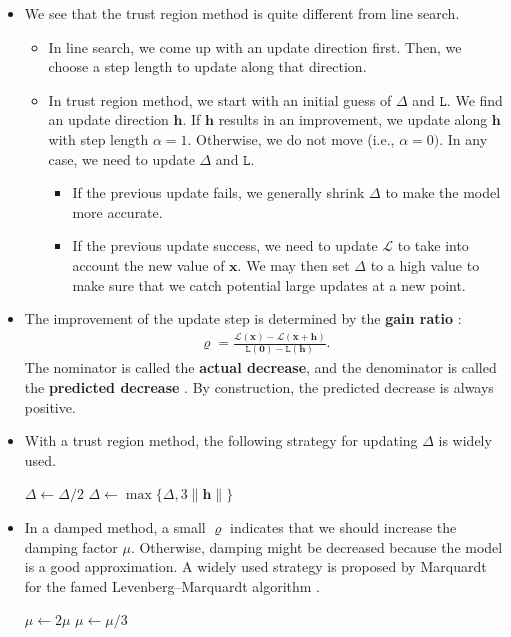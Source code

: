 \documentclass[10pt]{article}
\newcommand{\ve}[1]{\mathbf{#1}}
\newcommand{\mcal}[1]{\mathcal{#1}}
\begin{document}
\begin{itemize}
    \item We see that the trust region method is quite different from line search.
    \begin{itemize}
        \item In line search, we come up with an update direction first. Then, we choose a step length to update along that direction.
        \item In trust region method, we start with an initial guess of $\Delta$ and $\mathtt{L}$. We find an update direction $\ve{h}$. If $\ve{h}$ results in an improvement, we update along $\ve{h}$ with step length $\alpha = 1$. Otherwise, we do not move (i.e., $\alpha = 0)$. In any case, we need to update $\Delta$ and $\mathtt{L}$.
        \begin{itemize}
            \item If the previous update fails, we generally shrink $\Delta$ to make the model more accurate.
            \item If the previous update success, we need to update $\mathcal{L}$ to take into account the new value of $\ve{x}$. We may then set $\Delta$ to a high value to make sure that we catch potential large updates at a new point.
        \end{itemize}
    \end{itemize}    

    \item The improvement of the update step is determined by the {\bf gain ratio} \cite{Madsen:2004}:
    \begin{align*}
        \varrho = \frac{\mcal{L}(\ve{x}) - \mcal{L}(\ve{x}+\ve{h})}{\mathtt{L}(\ve{0}) - \mathtt{L}(\ve{h})}.
    \end{align*}
    The nominator is called the {\bf actual decrease}, and the denominator is called the {\bf predicted decrease} \cite{Norcedal:2006}. By construction, the predicted decrease is always positive.

    \item With a trust region method, the following strategy for updating $\Delta$ is widely used.
    \medskip
    \begin{algorithmic}
            \State $\Delta \gets \Delta / 2$
        \Else
            \State $\Delta \gets \max\{ \Delta, 3 \| \ve{h} \| \}$
        \EndIf
    \end{algorithmic}

    \item In a damped method, a small $\varrho$ indicates that we should increase the damping factor $\mu$. Otherwise, damping might be decreased because the model is a good approximation. A widely used strategy is proposed by Marquardt for the famed Levenberg--Marquardt algorithm \cite{Marquadrt:1963}.
    \medskip
    \begin{algorithmic}
            \State $\mu \gets 2 \mu$        
        \EndIf
            \State $\mu \gets \mu / 3$
        \EndIf
    \end{algorithmic}


\end{itemize}
\end{document}
